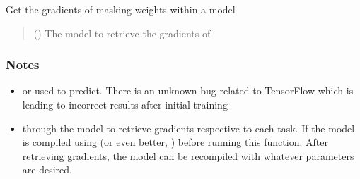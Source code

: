 \documentclass[letterpaper,10pt,english]{sphinxmanual}
\begin{document}

\begin{fulllineitems}
\label{\detokenize{beyondml.tflow.utils:beyondml.tflow.utils.utils.get_task_masking_gradients}}
\pysigstartsignatures
{}
\pysigstopsignatures
\sphinxAtStartPar
Get the gradients of masking weights within a model
\begin{quote}\begin{description}
\sphinxAtStartPar
{} () \textendash{} The model to retrieve the gradients of

\end{description}\end{quote}
\subsubsection*{Notes}
\begin{itemize}
\item {} \begin{description}
\sphinxAtStartPar
or used to predict.  There is an unknown bug related to TensorFlow which
is leading to incorrect results after initial training

\end{description}

\item {} \begin{description}
\sphinxAtStartPar
through the model to retrieve gradients respective to each task. If
the model is compiled using  (or even better, ) before running this function. After
retrieving gradients, the model can be recompiled with whatever parameters are desired.


\end{description}
\end{itemize}
\end{fulllineitems}
\end{document}
